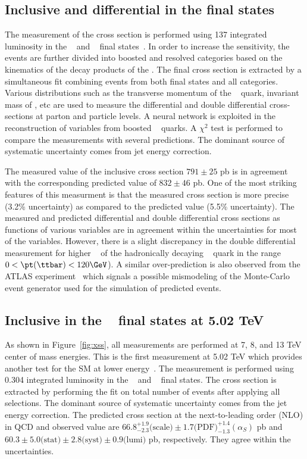 \subsection{Inclusive and differential \mes in the \ljets final states}
The measurement of the \ttbar cross section is performed using 137 \fbinv integrated luminosity in 
the \ejets~ and \mujets~ final states~\cite{CMS-PAS-TOP-20-001}. In order to increase the 
sensitivity, the events are further divided into boosted and resolved categories based on the 
kinematics of the decay products of the \ttbar. The final cross section is extracted by a 
simultaneous fit combining events from both final states and all categories. Various distributions 
such as the transverse momentum of the \PQt~ quark, invariant mass of \ttbar, etc are used to 
measure the differential and double differential cross-sections at parton and particle levels. A 
neural network is exploited in the reconstruction of variables from boosted \PQt~ quarks. 
A $\chi^2$ test is performed to compare the measurements with several predictions. The dominant 
source of systematic uncertainty comes from jet energy correction.

The measured value of the inclusive cross section $791\pm 25$ pb 
is in agreement with the corresponding predicted value of $832\pm 46$ pb. One of the most 
striking features of this measurment is that the measured cross section is more precise 
(3.2\% uncertainty) as compared to the predicted value (5.5\% uncertainty). The measured and 
predicted differential and double differential cross sections as functions of various variables are 
in agreement within the uncertainties for most of the variables. However, there is a slight 
discrepancy in the double differential measurement for higher \pt~ of the hadronically decaying \PQt~
quark in the range $ 0 < \pt (\ttbar) < 120 \GeV$). A similar over-prediction is 
also observed from the ATLAS experiment~\cite{ATLAS:2020ccu} which signals a possible mismodeling 
of the Monte-Carlo event generator used for the simulation of predicted events. 

\subsection{Inclusive in the \dilep~ final states at 5.02 TeV}
As shown in Figure~\ref{fig:xss}, all measurements are performed at 7, 8, and 13 TeV center of
mass energies. This is the first measurement at 5.02 TeV which provides another test for the 
SM at lower energy~\cite{CMS-PAS-TOP-20-004}. The measurement is performed using 0.304\fbinv 
integrated luminosity in the \ejets~ and \mujets~ final states. The cross section is extracted 
by performing the fit on total number of events after applying all selections. The dominant source 
of systematic uncertainty comes from the jet energy correction. The predicted cross section at the
next-to-leading order (NLO) in QCD and observed value are 
$66.8^{+1.9}_{-2.3}\text{(scale)}\pm 1.7\text{(PDF)}^{+1.4}_{-1.3}(\alpha_S)$ pb and 
$60.3 \pm 5.0 \text{(stat)} \pm 2.8 \text{(syst)} \pm 0.9 \text{(lumi)}$ pb, respectively. They
agree within the uncertainties. 

